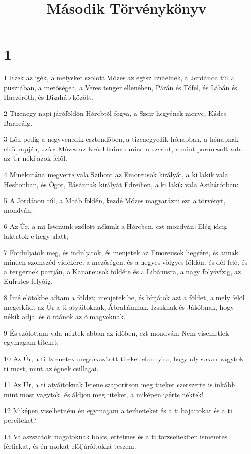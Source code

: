 

\title{Második Törvénykönyv}


\chapter{1}

\par 1 Ezek az igék, a melyeket szólott Mózes az egész Izráelnek, a Jordánon túl a pusztában, a mezõségen, a Veres tenger ellenében, Párán és Tófel, és Lábán és Haczéróth, és Dizaháb között.
\par 2 Tizenegy napi járóföldön Hórebtõl fogva, a Szeir hegyének  menve, Kádes-Barneáig.
\par 3 Lõn pedig a negyvenedik esztendõben, a tizenegyedik hónapban, a hónapnak elsõ napján, szóla Mózes az Izráel fiainak mind a szerint, a mint parancsolt vala az Úr néki azok felõl.
\par 4 Minekutána megverte vala Szihont az Emoreusok királyát, a ki lakik vala Hesbonban, és Ógot, Básánnak királyát Edreiben, a ki lakik vala Asthárótban:
\par 5 A Jordánon túl, a Moáb földén, kezdé Mózes magyarázni ezt a törvényt, mondván:
\par 6 Az Úr, a mi Istenünk szólott nékünk a Hóreben, ezt mondván: Elég ideig laktatok e hegy alatt;
\par 7 Forduljatok meg, és induljatok, és menjetek az Emoreusok hegyére, és annak minden szomszéd vidékére, a mezõségen, és a hegyes-völgyes földön, és dél felé, és a tengernek partján, a Kananeusok földére és a Libánusra, a nagy folyóvízig, az Eufrates folyóig.
\par 8 Ímé elõtökbe adtam a földet; menjetek be, és bírjátok azt a földet, a mely felõl megesküdt az Úr a ti atyáitoknak, Ábrahámnak, Izsáknak és Jákóbnak, hogy nékik adja, és õ utánok az õ magvoknak.
\par 9 És szólottam vala néktek abban az idõben, ezt mondván: Nem viselhetlek egymagam titeket;
\par 10 Az Úr, a ti Istenetek megsokasított titeket elannyira, hogy oly sokan vagytok ti most, mint az égnek csillagai.
\par 11 Az Úr, a ti atyáitoknak Istene szaporítson meg titeket ezerszerte is inkább mint most vagytok, és áldjon meg titeket, a miképen igérte néktek!
\par 12 Miképen viselhetném én egymagam a terheiteket és a ti bajaitokat és a ti pereiteket?
\par 13 Válaszszatok magatoknak bölcs, értelmes és a ti törzseitekben ismeretes férfiakat, és én azokat elõljáróitokká teszem.

